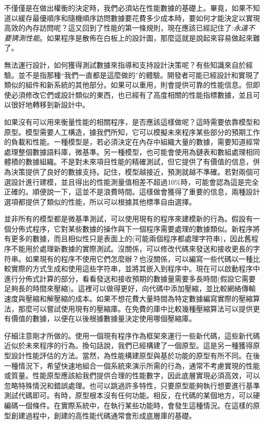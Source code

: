 不僅僅是在做出權衡的決定時，我們必須站在性能數據的基礎上。畢竟，如果不知道以緩存最優順序和隨機順序訪問數據要花費多少成本時，要如何才能決定以實現高效的內存訪問呢？這又回到了性能的第一條規則，現在應該已經記住了:\textit{永遠不要猜測性能}。如果程序是散佈在白板上的設計圖，那麼這就是說起來容易做起來難了。

無法運行設計，如何獲得測試數據來指導和支持設計決策呢？有些知識來自於經驗。並不是指那種“我們一直都是這麼做的”的體驗。開發者可能已經設計和實現了類似的組件和新系統的其他部分。如果可以重用，則會提供可靠的性能信息。但即使必須修改它們或設計類似的東西，也已經有了高度相關的性能指標數據，並且可以很好地轉移到新設計中。 

如果沒有可以用來衡量性能的相關程序，是否應該這樣做呢？這時需要依靠模型和原型。模型需要人工構造，據我們所知，它可以模擬未來程序某些部分的預期工作的負載和性能。一種模型是，若必須決定在內存中組織大量的數據，需要知道經常處理整個數據語料庫，微基準。另一種模型，也可能會使用為鏈表和數組處理相同體積的數據組織。不是對未來項目性能的精確測試，但它提供了有價值的信息，併為決策提供了良好的數據支持。記住，模型越接近，預測就越不準確。若對兩個可選設計進行建模，並且得出的性能測量值相差不超過10\%時，可能會認為這是完全正確的。順便說一下，這並不是浪費時間。這樣做會獲得了重要的信息，兩種設計選項都提供了類似的性能，所以可以根據其他標準自由選擇。 

並非所有的模型都是微基準測試，可以使用現有的程序來建模新的行為。假設有一個分佈式程序，它對某些數據的操作與下一個程序需要處理的數據類似。新程序將有更多的數據，而且相似性只是表面上的(可能兩個程序都處理字符串)，因此舊程序不能用於處理新數據的實際測試。沒關係，可以修改代碼來發送和接收更長的字符串。如果現有的程序不使用它們怎麼辦？也沒關係，可以編寫一些代碼以一種比較實際的方式生成和使用這些字符串，並將其嵌入到程序中。現在可以啟動程序中進行分佈式計算的部分，看看發送和接收預期的數據量需要多長時間(假設它需要足夠長的時間來壓縮)。這裡可以做得更好，向代碼中添加壓縮，並比較網絡傳輸速度與壓縮和解壓縮的成本。如果不想花費大量時間為特定數據編寫實際的壓縮算法，那麼可以嘗試使用現有的壓縮庫。在免費的庫中比較幾種壓縮算法可以提供更有價值的數據，以便在以後根據數據量決定使用哪個壓縮庫。 

仔細注意剛才所做的。使用一個現有程序作為框架來運行一些新代碼，這些新代碼近似於未來程序的行為。換句話說，我們已經構建了一個原型。這是另一種獲得原型設計性能評估的方法。當然，為性能構建原型與基於功能的原型有所不同。在後一種情況下，希望快速地組合一個系統來演示所需的行為，通常不考慮實現的性能或質量。性能原型應該給我們提供合理的性能數字，因此底層實現必須高效，可以忽略特殊情況和錯誤處理。也可以跳過許多特性，只要原型能夠執行想要進行基準測試代碼即可。有時，原型根本沒有任何功能。相反，在代碼的某個地方，可以硬編碼一個條件。在實際系統中，在執行某些功能時，會發生這種情況。在這樣的原型創建過程中，創建的高性能代碼通常會形成底層庫的基礎。

